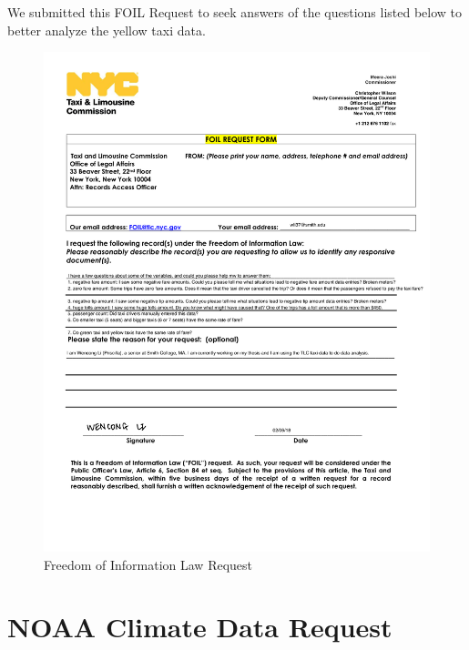\documentclass[12pt,twoside]{reedthesis}
\theoremstyle{definition}
\theoremstyle{definition}
\theoremstyle{definition}
\theoremstyle{remark}
\begin{document}
We submitted this FOIL Request to seek answers of the questions listed
below to better analyze the yellow taxi data.
\begin{figure}

{\centering \includegraphics[width=6.38in]{figure/appendix_foil_form_doc} 

}

\caption{Freedom of Information Law Request}\label{fig:foil}
\end{figure}
\chapter{NOAA Climate Data Request}\label{noaa-climate-data-request}
\end{document}

